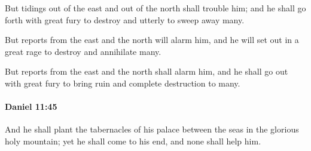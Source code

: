 			\begin{versebox}
					\item[BHS] 
					\item[LXX] 
					\item[ASV] But tidings out of the east and out of the north shall trouble him; and he shall go forth with great fury to destroy and utterly to sweep away many.
					\item[NIV] But reports from the east and the north will alarm him, and he will set out in a great rage to destroy and annihilate many.
					\item[NRSV] But reports from the east and the north shall alarm him, and he shall go out with great fury to bring ruin and complete destruction to many.
			\end{versebox}

		\paragraph{Daniel 11:45} %
			\label{DANIEL-11-45}

			And he shall plant the tabernacles of his palace between the seas in the glorious holy mountain; yet he shall come to his end, and none shall help him.

